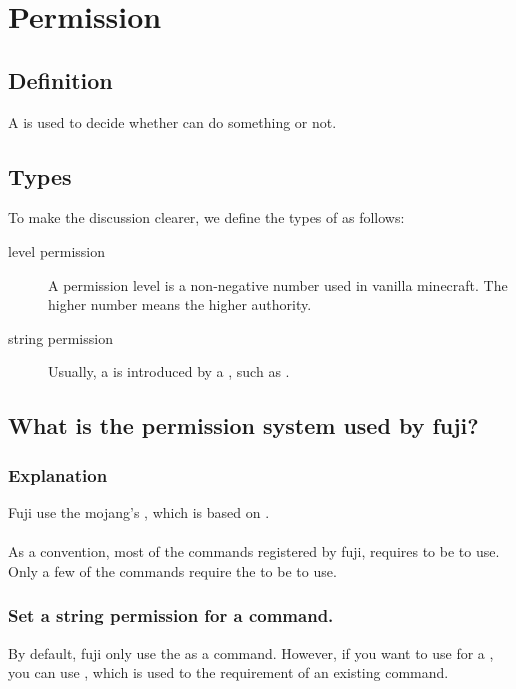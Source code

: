 \chapter{Permission}\label{ch:permission}
\section{Definition}
A  is used to decide whether  can do something or not.


\section{Types}
To make the discussion clearer, we define the types of  as follows:
\begin{description}
    \item [level permission] A permission level is a non-negative number used in vanilla minecraft.
    The higher number means the higher authority.
    \item[string permission] Usually, a  is introduced by a , such as .
\end{description}

\clearpage


\section{What is the permission system used by fuji?}

\subsection{Explanation}
Fuji use the mojang's , which is based on .
\\
\\
As a convention, most of the commands registered by fuji, requires  to be  to use.
Only a few of the commands require the  to be  to use.

\subsection{Set a string permission for a command.}
By default, fuji only use the  as  a command.
However, if you want to use  for a , you can use , which is used to  the requirement of an existing command.

